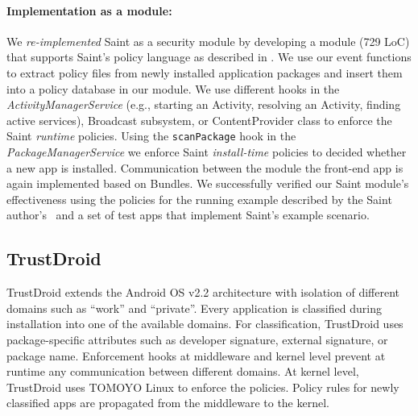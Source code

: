 \documentclass[letterpaper,twocolumn,10pt]{article}
\begin{document}
\paragraph{Implementation as a module:} We \textit{re-implemented} Saint as a security module by developing a module (729 LoC) that supports Saint's policy language as described in \cite{OnMcEnMc_09:Saint}. We use our event functions to extract policy files from newly installed application packages and insert them into a policy database in our module. We use different hooks in the \textit{ActivityManagerService} (e.g., starting an Activity, resolving an Activity, finding active services), Broadcast subsystem, or ContentProvider class to enforce the Saint \textit{runtime} policies. Using the \texttt{scanPackage} hook in the \textit{PackageManagerService} we enforce Saint \textit{install-time} policies to decided whether a new app is installed. Communication between the module the front-end app is again implemented based on Bundles. We successfully verified our Saint module's effectiveness using the policies for the running example described by the Saint author's~\cite{OnMcEnMc_09:Saint} and a set of test apps that implement Saint's example scenario.

\subsection{TrustDroid~\cite{trustdroid}}

TrustDroid extends the Android OS v2.2 architecture with isolation of different domains such as ``work'' and ``private''. Every application is classified during installation into one of the available domains. For classification, TrustDroid uses package-specific attributes such as developer signature, external signature, or package name. Enforcement hooks at middleware and kernel level prevent at runtime any communication between different domains. At kernel level, TrustDroid uses TOMOYO Linux to enforce the policies. Policy rules for newly classified apps are propagated from the middleware to the kernel.
\end{document}
